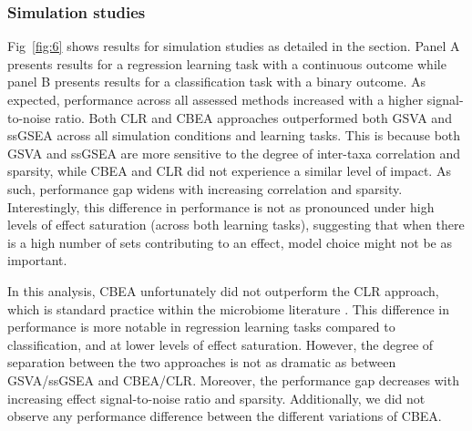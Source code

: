\subsubsection*{Simulation studies}
Fig~\ref{fig:6} shows results for simulation studies as detailed in the  section. Panel A presents results for a regression learning task with a continuous outcome while panel B presents results for a classification task with a binary outcome. As expected, performance across all assessed methods increased with a higher signal-to-noise ratio. Both CLR and CBEA approaches outperformed both GSVA and ssGSEA across all simulation conditions and learning tasks. This is because both GSVA and ssGSEA are more sensitive to the degree of inter-taxa correlation and sparsity, while CBEA and CLR did not experience a similar level of impact. As such, performance gap widens with increasing correlation and sparsity. Interestingly, this difference in performance is not as pronounced under high levels of effect saturation (across both learning tasks), suggesting that when there is a high number of sets contributing to an effect, model choice might not be as important.   

In this analysis, CBEA unfortunately did not outperform the CLR approach, which is standard practice within the microbiome literature \cite{gloor2017}. This difference in performance is more notable in regression learning tasks compared to classification, and at lower levels of effect saturation. However, the degree of separation between the two approaches is not as dramatic as between GSVA/ssGSEA and CBEA/CLR. Moreover, the performance gap decreases with increasing effect signal-to-noise ratio and sparsity. Additionally, we did not observe any performance difference between the different variations of CBEA. 

